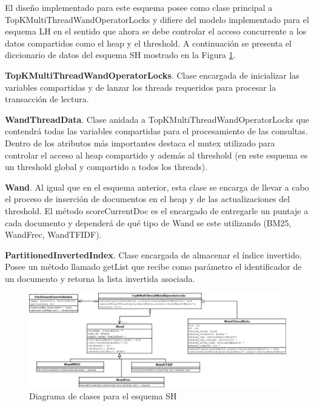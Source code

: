 El diseño implementado para este esquema posee como clase principal a TopKMultiThreadWandOperatorLocks y difiere del modelo implementado para el esquema LH en el sentido que ahora se debe controlar el acceso concurrente a los datos compartidos como el heap y el threshold. A continuación se presenta el diccionario de datos del esquema SH mostrado en la Figura \ref{fig:TopKMultiThreadWandOperatorLocks}.

\begin{list}{}{}
	\item \textbf{TopKMultiThreadWandOperatorLocks}. Clase encargada de inicializar las variables compartidas y de lanzar los threads requeridos para procesar la transacción de lectura.
	
	\item \textbf{WandThreadData}. Clase anidada a TopKMultiThreadWandOperatorLocks que contendrá todas las variables compartidas para el procesamiento de las consultas. Dentro de los atributos más importantes destaca el mutex utilizado para controlar el acceso al heap compartido y además al threshold (en este esquema es un threshold global y compartido a todos los threads).
	
	\item \textbf{Wand}. Al igual que en el esquema anterior, esta clase se encarga de llevar a cabo el proceso de inserción de documentos en el heap y de las actualizaciones del threshold. El método scoreCurrentDoc es el encargado de entregarle un puntaje a cada documento y dependerá de qué tipo de Wand se este utilizando (BM25, WandFrec, WandTFIDF). 

	\item \textbf{PartitionedInvertedIndex}. Clase encargada de almacenar el índice invertido. Posee un método llamado getList que recibe como parámetro el identificador de un documento y retorna la lista invertida asociada. 

\end{list}

\begin{figure}[H]
\centering
\includegraphics[scale=.75]{images/TopKMultiThreadWandOperatorLocks.png}
\caption{Diagrama de clases para el esquema SH}
\label{fig:TopKMultiThreadWandOperatorLocks}
\end{figure}


